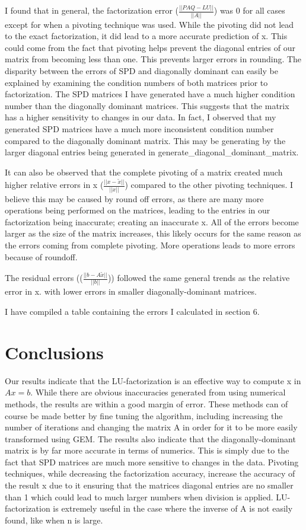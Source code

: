 \documentclass[12pt, letterpaper]{article}
\begin{document}
I found that in general, the factorization error ($\frac{||PAQ-LU||}{||A||}$) was 0 for all cases except for when a pivoting technique was used. While the pivoting did not lead to the exact factorization, it did lead to a more accurate prediction of x. This could come from the fact that pivoting helps prevent the diagonal entries of our matrix from becoming less than one. This prevents larger errors in rounding.
The disparity between the errors of SPD and diagonally dominant can easily be explained by examining the condition numbers of both matrices prior to factorization. The SPD matrices I have generated have a much higher condition number than the diagonally dominant matrices. This suggests that the matrix has a higher sensitivity to changes in our data. In fact, I observed that my generated SPD matrices have a much more inconsistent condition number compared to the diagonally dominant matrix. This may be generating by the larger diagonal entries being generated in generate\_diagonal\_dominant\_matrix.

It can also be observed that the complete pivoting of a matrix created much higher relative errors in x ($\frac{||x-\tilde{x}||}{||x||}$) compared to the other pivoting techniques. I believe this may be caused by round off errors, as there are many more operations being performed on the matrices, leading to the entries in our factorization being inaccurate; creating an inaccurate x.
All of the errors become larger as the size of the matrix increases, this likely occurs for the same reason as the errors coming from complete pivoting. More operations leads to more errors because of roundoff. 

The residual errors (($\frac{||b-A\tilde{x}||}{||b||}$)) followed the same general trends as the relative error in x. with lower errors in smaller diagonally-dominant matrices.

I have compiled a table containing the errors I calculated in section 6.

\section{Conclusions}

Our results indicate that the LU-factorization is an effective way to compute x in $Ax=b$. While there are obvious inaccuracies generated from using numerical methods, the results are within a good margin of error. These methods can of course be made better by fine tuning the algorithm, including increasing the number of iterations and changing the matrix A in order for it to be more easily transformed using GEM. 
The results also indicate that the diagonally-dominant matrix is by far more accurate in terms of numerics. This is simply due to the fact that SPD matrices are much more sensitive to changes in the data. Pivoting techniques, while decreasing the factorization accuracy, increase the accuracy of the result x due to it ensuring that the matrices diagonal entries are no smaller than 1 which could lead to much larger numbers when division is applied.
LU-factorization is extremely useful in the case where the inverse of A is not easily found, like when n is large.
\end{document}
